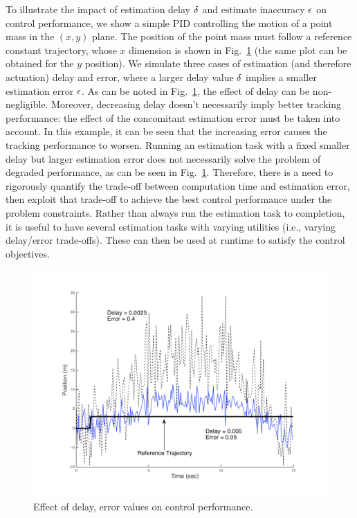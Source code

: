 \begin{exmp}
\label{motivatingExample}
To illustrate the impact of estimation delay $\delta$ and estimate inaccuracy $\epsilon$ on control performance, we show a simple PID controlling the motion of a point mass in the $(x,y)$ plane.
The position of the point mass must follow a reference constant trajectory, whose $x$ dimension is shown in Fig.~\ref{fig:toyplot} (the same plot can be obtained for the $y$ position).
We simulate three cases of estimation (and therefore actuation) delay and error, where a larger delay value $\delta$ implies a smaller estimation error $\epsilon$.
As can be noted in Fig.~\ref{fig:toyplot}, the effect of delay can be non-negligible.
Moreover, decreasing delay doesn't necessarily imply better tracking performance: the effect of the concomitant estimation error must be taken into account. 
In this example, it can be seen that the increasing error causes the tracking performance to worsen.
Running an estimation task with a fixed smaller delay but larger estimation error does not necessarily solve the problem of degraded performance, as can be seen in Fig.~\ref{fig:toyplot}.
Therefore, there is a need to rigorously quantify the trade-off between computation time and estimation error, then exploit that trade-off to achieve the best control performance under the problem constraints.
Rather than always run the estimation task to completion, it is useful to have several estimation tasks with varying utilities (i.e., varying delay/error trade-offs).
These can then be used at runtime to satisfy the control objectives.
\exmend

\begin{figure}[t]
\centering
\includegraphics[scale=0.3]{figures/toyplot}
\caption{Effect of delay, error values on control performance.}
\label{fig:toyplot}
\end{figure}
\end{exmp}


